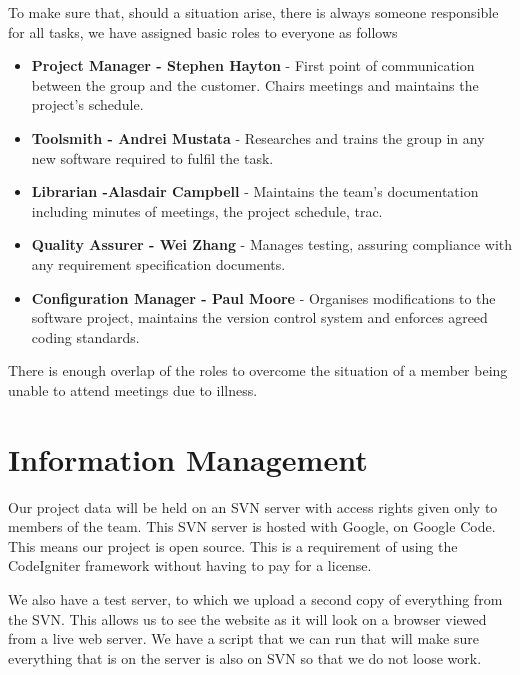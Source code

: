\documentclass{l3proj}
\begin{document}
To make sure that, should a situation arise, there is always someone responsible for all tasks, we have assigned basic roles to everyone as follows

\begin{itemize}
\item{\textbf{Project Manager - Stephen Hayton} - First point of communication between the group and the customer. Chairs meetings and maintains the project’s schedule.}
\item{\textbf{Toolsmith - Andrei Mustata} - Researches and trains the group in any new software required to fulfil the task.}
\item{\textbf{Librarian -Alasdair Campbell} - Maintains the team’s documentation including minutes of meetings, the project schedule, trac.}
\item{\textbf{Quality Assurer - Wei Zhang} - Manages testing, assuring compliance with any requirement specification documents.}
\item{\textbf{Configuration Manager - Paul Moore} - Organises modifications to the software project, maintains the version control system and enforces agreed coding standards.}
\end{itemize}

There is enough overlap of the roles to overcome the situation of a member being unable to attend
meetings due to illness.

\section{Information Management}
\label{sect:info-man}
Our project data will be held on an SVN server with access rights given only to
members of the team. This SVN server is hosted with Google, on Google Code. This
means our project is open source. This is a requirement of using the CodeIgniter
framework without having to pay for a license. 

We also have a test server, to which we upload a second copy of everything from
the SVN. This allows us to see the website as it will look on a browser viewed
from a live web server. We have a script that we can run that will make sure
everything that is on the server is also on SVN so that we do not loose work.
\end{document}
